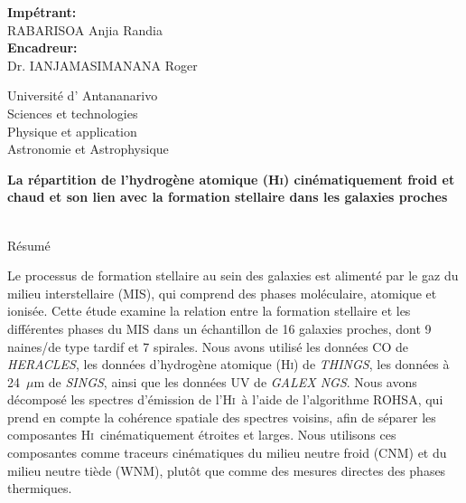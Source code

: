 \documentclass[12pt]{article}
\newcommand{\HI}{\textrm{H\textsc{i}}}
\begin{document}
\pagestyle{empty}
	\begin{minipage}[t]{0.48\textwidth}
		\textbf{Imp\'etrant:} \\
		RABARISOA Anjia Randia \\
		\textbf{Encadreur:}\\
		Dr. IANJAMASIMANANA Roger
		
	\end{minipage}
	\hfill
	\begin{minipage}[t]{0.48\textwidth}
		\raggedleft
		Universit\'e d' Antananarivo\\
		Sciences et technologies\\
		Physique et application\\
		Astronomie et Astrophysique\\
	\end{minipage}
	\vspace{1cm}
	\begin{center}
		\large \parbox{\linewidth}{\centering\fontsize{15}{18}\selectfont\linespread{1}\selectfont\bfseries La répartition de l'hydrogène atomique (\HI) cinématiquement froid et chaud et son lien avec la formation stellaire dans les galaxies proches}\\[1em]

		R\'esum\'e
	\end{center}
	
	\vspace{1em}
	
Le processus de formation stellaire au sein des galaxies est aliment\'e par le gaz du milieu interstellaire (MIS), qui comprend des phases moléculaire, atomique et ionisée. Cette \'etude examine la relation entre la formation stellaire et les diff\'erentes phases du MIS dans un \'echantillon de 16 galaxies proches, dont 9 naines/de type tardif et 7 spirales.
Nous avons utilis\'e les données CO de \textit{HERACLES}, les données d'hydrog\`ene atomique (\HI) de \textit{THINGS}, les donn\'ees à 24~$\mu$m de \textit{SINGS}, ainsi que les donn\'ees UV de \textit{GALEX NGS}.
Nous avons décomposé les spectres d'émission de l'\HI\ à l'aide de l'algorithme ROHSA, qui prend en compte la cohérence spatiale des spectres voisins, afin de séparer les composantes \HI\ cinématiquement étroites et larges. Nous utilisons ces composantes comme traceurs cinématiques du milieu neutre froid (CNM) et du milieu neutre tiède (WNM), plutôt que comme des mesures directes des phases thermiques.
\end{document}

